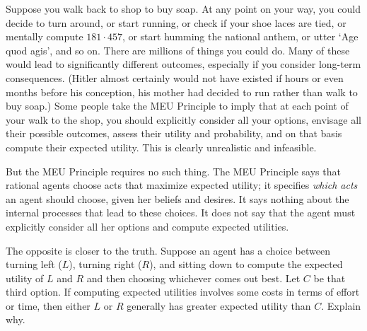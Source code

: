Suppose you walk back to shop to buy soap. At any point on your way,
you could decide to turn around, or start running, or check if your
shoe laces are tied, or mentally compute $181 \cdot 457$, or start humming
the national anthem, or utter `Age quod agis', and so on. There are
millions of things you could do. Many of these would lead to
significantly different outcomes, especially if you consider long-term
consequences. (Hitler almost certainly would not have existed if hours
or even months before his conception, his mother had decided to run
rather than walk to buy soap.) Some people take the MEU Principle to
imply that at each point of your walk to the shop, you should
explicitly consider all your options, envisage all their possible
outcomes, assess their utility and probability, and on that basis
compute their expected utility. This is clearly unrealistic and
infeasible.

But the MEU Principle requires no such thing. The MEU Principle says
that rational agents choose acts that maximize expected utility; it
specifies \emph{which acts} an agent should choose, given her beliefs
and desires. It says nothing about the internal processes that lead to
these choices. It does not say that the agent must
explicitly consider all her options and compute expected utilities.

\begin{exercise2}
  The opposite is closer to the truth. Suppose an agent has a choice
  between turning left ($L$), turning right ($R$), and sitting down to
  compute the expected utility of $L$ and $R$ and then choosing
  whichever comes out best. Let $C$ be that third option. If computing
  expected utilities involves some costs in terms of effort or time,
  then either $L$ or $R$ generally has greater expected utility than
  $C$. Explain why.
\end{exercise2}

